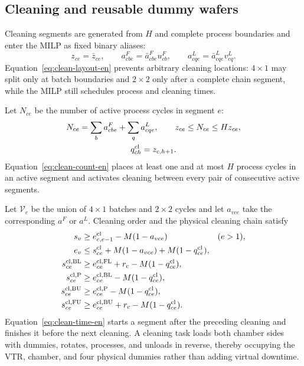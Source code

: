 \documentclass[final,5p,times,twocolumn]{elsarticle}
\begin{document}
\subsection{Cleaning and reusable dummy wafers}

Cleaning segments are generated from $H$ and complete process boundaries and enter the MILP as fixed binary aliases:
\begin{equation}
z_{ce}=\bar z_{ce},\qquad
a^F_{cbe}=\bar a^F_{cbe}u^F_{cb},\qquad
a^L_{cqe}=\bar a^L_{cqe}v^L_{cq}.
\label{eq:clean-layout-en}
\end{equation}
Equation~\eqref{eq:clean-layout-en} prevents arbitrary cleaning locations: $4\times1$ may split only at batch boundaries and $2\times2$ only after a complete chain segment, while the MILP still schedules process and cleaning times.

Let $N_{ce}$ be the number of active process cycles in segment $e$:
\begin{equation}
\begin{gathered}
N_{ce}=\sum_b a^F_{cbe}+\sum_q a^L_{cqe},\qquad
z_{ce}\le N_{ce}\le Hz_{ce},\\
q^{\rm cl}_{ch}=z_{c,h+1}.
\end{gathered}
\label{eq:clean-count-en}
\end{equation}
Equation~\eqref{eq:clean-count-en} places at least one and at most $H$ process cycles in an active segment and activates cleaning between every pair of consecutive active segments.

Let $\mathcal V_c$ be the union of $4\times1$ batches and $2\times2$ cycles and let $a_{vce}$ take the corresponding $a^F$ or $a^L$. Cleaning order and the physical cleaning chain satisfy
\begin{equation}
\begin{aligned}
s_v&\ge e^{\rm cl}_{c,e-1}-M(1-a_{vce}) &&(e>1),\\
e_v&\le s^{\rm cl}_{ce}+M(1-a_{vce})+M(1-q^{\rm cl}_{ce}),\\
s^{\rm cl,BL}_{ce}&\ge e^{\rm cl,FL}_{ce}+r_c-M(1-q^{\rm cl}_{ce}),\\
s^{\rm cl,P}_{ce}&\ge e^{\rm cl,BL}_{ce}-M(1-q^{\rm cl}_{ce}),\\
s^{\rm cl,BU}_{ce}&\ge e^{\rm cl,P}_{ce}-M(1-q^{\rm cl}_{ce}),\\
s^{\rm cl,FU}_{ce}&\ge e^{\rm cl,BU}_{ce}+r_c-M(1-q^{\rm cl}_{ce}).
\end{aligned}
\label{eq:clean-time-en}
\end{equation}
Equation~\eqref{eq:clean-time-en} starts a segment after the preceding cleaning and finishes it before the next cleaning. A cleaning task loads both chamber sides with dummies, rotates, processes, and unloads in reverse, thereby occupying the VTR, chamber, and four physical dummies rather than adding virtual downtime.
\end{document}

